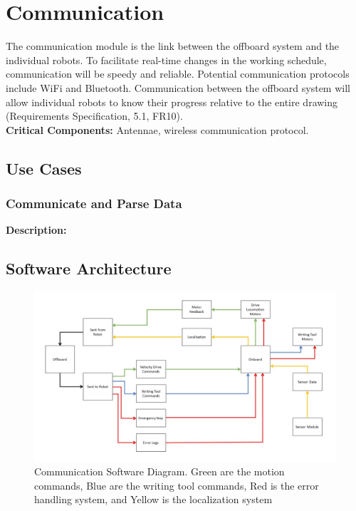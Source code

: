 
\section{Communication}
\label{sec:communication}
The communication module is the link between the offboard system and the individual robots. To facilitate real-time changes in the working schedule, communication will be speedy and reliable. Potential communication protocols include WiFi and Bluetooth. Communication between the offboard system will allow individual robots to know their progress relative to the entire drawing (Requirements Specification, 5.1, FR10). \\

\noindent
\textbf{Critical Components:} Antennae, wireless communication protocol. 

\subsection{Use Cases}
\subsubsection{Communicate and Parse Data}
\textbf{Description:} 


\subsection{Software Architecture}
\label{sec:sw_arch_communication}

\begin{figure}[h!]
 \centering
  \includegraphics[width=0.99\columnwidth]{diagrams/sw_arch_communication.jpg}
	\caption{Communication Software Diagram. Green are the motion commands, Blue are the writing tool commands, Red is the error handling system, and Yellow is the localization system}
 \label{fig:comm_processing}
\end{figure}

